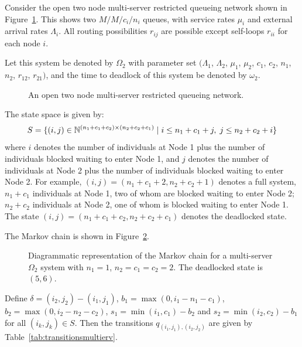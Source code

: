 \documentclass{article}
\numberwithin{equation}{section}
\begin{document}
Consider the open two node multi-server restricted queueing network shown in Figure~\ref{fig:queueingnetwork_2nodemulti}.
This shows two \(M/M/c_i/n_i\) queues, with service rates $\mu_i$ and external arrival rates $\Lambda_i$.
All routing possibilities $r_{ij}$ are possible except self-loops $r_{ii}$ for each node $i$.

Let this system be denoted by $\Omega_2$ with parameter set $(\Lambda_1$, $\Lambda_2$, $\mu_1$, $\mu_2$, $c_1$, $c_2$, $n_1$, $n_2$, $r_{12}$, $r_{21})$, and the time to deadlock of this system be denoted by $\omega_2$.

\begin{figure}[!htbp]
  \begin{center}
  
  \end{center}
  \caption{An open two node multi-server restricted queueing network.}
  \label{fig:queueingnetwork_2nodemulti}
\end{figure}

The state space is given by:
        \[S = \{(i,j)\in\mathbb{N}^{(n_1+c_1+c_2)\times (n_2+c_2+c_1)} \nonscript\; | \nonscript\; i \leq n_1+c_1+j, \nonscript\; j \leq n_2+c_2+i\}\]
where $i$ denotes the number of individuals at Node 1 plus the number of individuals blocked waiting to enter Node 1, and $j$ denotes the number of individuals at Node 2 plus the number of individuals blocked waiting to enter Node 2.
For example, $(i, j) = (n_1+c_1+2, n_2+c_2+1)$ denotes a full system, $n_1+c_1$ individuals at Node 1, two of whom are blocked waiting to enter Node 2; $n_2+c_2$ individuals at Node 2, one of whom is blocked waiting to enter Node 1.
The state $(i, j) = (n_1+c_1+c_2, n_2+c_2+c_1)$ denotes the deadlocked state.

The Markov chain is shown in Figure~\ref{fig:2nodeMCms}.

\begin{figure}[!htbp]
    
    \caption{Diagrammatic representation of the Markov chain for a multi-server $\Omega_2$ system with $n_1=1$, $n_2=c_1=c_2=2$. The deadlocked state is $(5,6)$.}
    \label{fig:2nodeMCms}
\end{figure}

Define $\delta = (i_2, j_2) - (i_1, j_1)$, $b_1 = \max(0, i_1-n_1-c_1)$, $b_2 = \max(0, i_2-n_2-c_2)$, $s_1 = \min(i_1, c_1)-b_2$ and $s_2 = \min(i_2, c_2)-b_1$ for all $(i_k, j_k) \in S$.
Then the transitions $q_{(i_1, j_1),(i_2, j_2)}$ are given by Table~\ref{tab:transitionsmultierv}.
\end{document}
